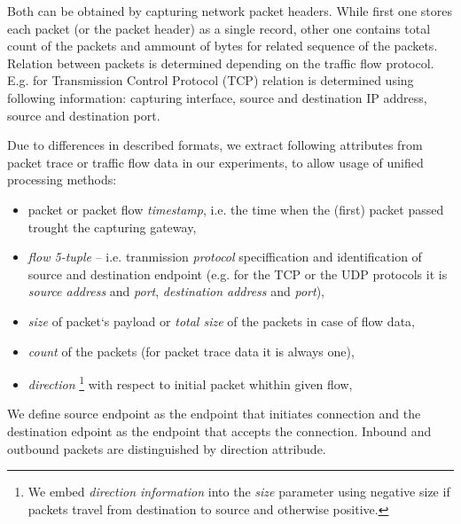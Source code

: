 Both can be obtained by capturing
network packet headers. While first one stores each packet (or the packet header)
as a single record,
other one contains total count of the packets and ammount of bytes for 
related sequence of the packets. Relation between packets is determined depending 
on the traffic flow protocol. E.g. for Transmission Control Protocol (TCP) relation is 
determined using following information: capturing interface, source and destination IP address,
source and destination port. 
%
%

Due to differences in described formats, we extract following attributes 
from packet trace or traffic flow data in our experiments, 
to allow usage of unified processing methods:
\begin{itemize}
	\item packet or packet flow \emph{timestamp}, i.e. the time when the (first) packet passed
	trought the capturing gateway,
	\item \emph{flow 5-tuple} -- i.e. tranmission \emph{protocol} speciffication and identification of 
	source and destination endpoint
	(e.g. for the TCP or the UDP protocols it is \emph{source address} and \emph{port}, 
	\emph{destination address}  and \emph{port}),
	\item \emph{size} of packet`s payload or \emph{total size} of the packets in case of flow data,
	\item \emph{count} of the packets (for packet trace data it is always one),
	\item \emph{direction}%
	\footnote{%
		We embed \emph{direction information} 
		into the \emph{size} parameter using negative size  
		if packets travel from destination to source and otherwise positive.%
	} %
	with respect to initial packet whithin given flow,
\end{itemize}

We define source endpoint as the endpoint that initiates connection and the destination edpoint 
as the endpoint that  accepts the connection. %
Inbound and outbound packets are distinguished
by direction attribude. 

